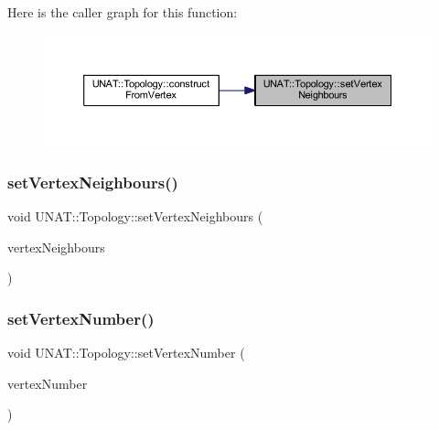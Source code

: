 Here is the caller graph for this function\+:
\nopagebreak
\begin{figure}[H]
\begin{center}
\leavevmode
\includegraphics[width=350pt]{classUNAT_1_1Topology_aa82494c4b097ebb30f323947c9f3161e_icgraph}
\end{center}
\end{figure}
\mbox{\label{classUNAT_1_1Topology_aa82494c4b097ebb30f323947c9f3161e}} 
\subsubsection{\texorpdfstring{setVertexNeighbours()}{setVertexNeighbours()}\hspace{0.1cm}{\footnotesize\ttfamily [3/3]}}
{\footnotesize\ttfamily void U\+N\+A\+T\+::\+Topology\+::set\+Vertex\+Neighbours (\begin{DoxyParamCaption}\item[{\mbox{\hyperlink{include_2swMacro_8h_a113cf5f6b5377cdf3fac6aa4e443e9aa}{sw\+Int}} $\ast$}]{vertex\+Neighbours }\end{DoxyParamCaption})\hspace{0.3cm}{\ttfamily [inline]}}

\mbox{\label{classUNAT_1_1Topology_aeddafa74ad2dc0769cf5e0a3384a20ce}} 
\subsubsection{\texorpdfstring{setVertexNumber()}{setVertexNumber()}\hspace{0.1cm}{\footnotesize\ttfamily [1/3]}}
{\footnotesize\ttfamily void U\+N\+A\+T\+::\+Topology\+::set\+Vertex\+Number (\begin{DoxyParamCaption}\item[{\mbox{\hyperlink{include_2swMacro_8h_a113cf5f6b5377cdf3fac6aa4e443e9aa}{sw\+Int}}}]{vertex\+Number }\end{DoxyParamCaption})\hspace{0.3cm}{\ttfamily [inline]}}

